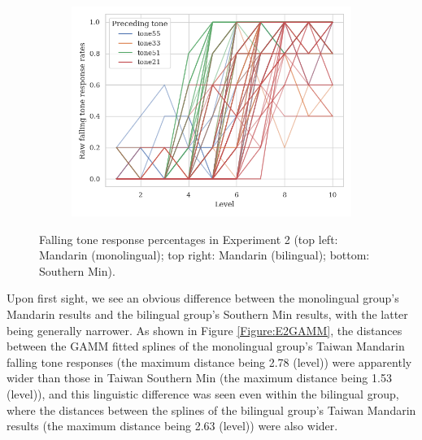 \begin{figure}[hbt!]
\begin{subfigure}[b]{.45\textwidth}
\end{subfigure}
\hfill
\begin{subfigure}[b]{.45\textwidth}
\centering
\includegraphics[width=\textwidth]{figures/E2/Min_E2_raw.png}
\end{subfigure}
\caption{Falling tone response percentages in Experiment 2 (top left: Mandarin (monolingual); top right: Mandarin (bilingual); bottom: Southern Min).}
\label{Figure:E2Raw}
\end{figure}

Upon first sight, we see an obvious difference between the monolingual group's Mandarin results and the bilingual group's Southern Min results, with the latter being generally narrower. As shown in Figure \ref{Figure:E2GAMM}, the distances between the GAMM fitted splines of the monolingual group's Taiwan Mandarin falling tone responses (the maximum distance being 2.78 (level)) were apparently wider than those in Taiwan Southern Min (the maximum distance being 1.53 (level)), and this linguistic difference was seen even within the bilingual group, where the distances between the splines of the bilingual group's Taiwan Mandarin results (the maximum distance being 2.63 (level)) were also wider.

